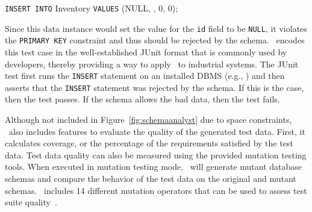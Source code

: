 
\vspace*{.1in}
\texttt{INSERT INTO} Inventory \texttt{VALUES} (NULL, \textquotesingle\textquotesingle, 0, 0);
\vspace*{.1in}


Since this data instance would set the value for the \texttt{id} field to be \texttt{NULL}, it violates the
\texttt{PRIMARY KEY} constraint and thus should be rejected by the schema. \sa~encodes this test case in the
well-established JUnit format that is commonly used by developers, thereby providing a way to apply \sa~to industrial
systems.  The JUnit test first runs the \texttt{INSERT} statement on an installed DBMS (e.g., \sqlite) and then asserts
that the \texttt{INSERT} statement was rejected by the schema. If this is the case, then the test passes.  If the schema
allows the bad data, then the test fails.


Although not included in Figure~\ref{fig:schemaanalyst} due to space constraints, \sa~also includes features to evaluate
the quality of the generated test data. First, it calculates coverage, or the percentage of the requirements satisfied
by the test data.  Test data quality can also be measured using the provided mutation testing tools. When executed in
mutation testing mode, \sa~will generate mutant database schemas and compare the behavior of the test data on the
original and mutant schemas. \sa~includes 14 different mutation operators that can be used to assess test suite
quality~\cite{wright2015mutation}.



